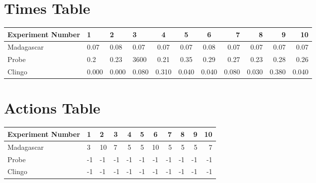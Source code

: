 \documentclass[8pt]{article}
\begin{document}
\begin{landscape}
\section{Times Table}\begin{tabular}{ | l | l | l | l | c | c | c | r | r | r | r | }\hline
Experiment Number & 1 & 2 & 3 & 4 & 5 & 6 & 7 & 8 & 9 & 10\\  \hline
Madagascar & 0.07 & 0.08 & 0.07 & 0.07 & 0.07 & 0.08 & 0.07 & 0.07 & 0.07 & 0.07\\  \hline
Probe & 0.2 & 0.23 & 3600 & 0.21 & 0.35 & 0.29 & 0.27 & 0.23 & 0.28 & 0.26\\  \hline
Clingo & 0.000 & 0.000 & 0.080 & 0.310 & 0.040 & 0.040 & 0.080 & 0.030 & 0.380 & 0.040\\ \hline
\end{tabular}
\section{Actions Table}\begin{tabular}{ | l | l | l | l | c | c | c | r | r | r | r | }\hline
Experiment Number & 1 & 2 & 3 & 4 & 5 & 6 & 7 & 8 & 9 & 10\\ \hline
 Madagascar & 3 & 10 & 7 & 5 & 5 & 10 & 5 & 5 & 5 & 7\\ \hline
 Probe & -1 & -1 & -1 & -1 & -1 & -1 & -1 & -1 & -1 & -1\\ \hline
 Clingo & -1 & -1 & -1 & -1 & -1 & -1 & -1 & -1 & -1 & -1\\ \hline
\end{tabular}
\end{landscape}
\end{document}
